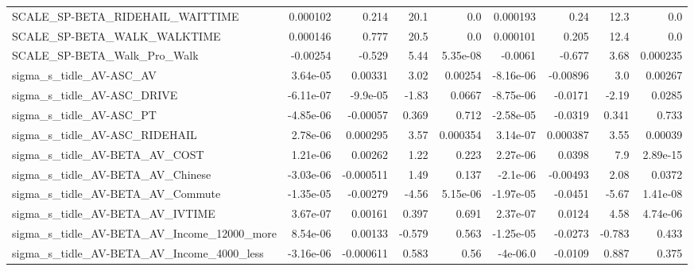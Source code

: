 \begin{tabular}{lrrrrrrrr}
SCALE\_SP-BETA\_RIDEHAIL\_WAITTIME                    &    0.000102 &        0.214 &      20.1 &      0.0 &   0.000193 &        0.24 &         12.3 &           0.0 \\
SCALE\_SP-BETA\_WALK\_WALKTIME                        &    0.000146 &        0.777 &      20.5 &      0.0 &   0.000101 &       0.205 &         12.4 &           0.0 \\
SCALE\_SP-BETA\_Walk\_Pro\_Walk                        &    -0.00254 &       -0.529 &      5.44 & 5.35e-08 &    -0.0061 &      -0.677 &         3.68 &      0.000235 \\
sigma\_s\_tidle\_AV-ASC\_AV                            &    3.64e-05 &      0.00331 &      3.02 &  0.00254 &  -8.16e-06 &    -0.00896 &          3.0 &       0.00267 \\
sigma\_s\_tidle\_AV-ASC\_DRIVE                         &   -6.11e-07 &     -9.9e-05 &     -1.83 &   0.0667 &  -8.75e-06 &     -0.0171 &        -2.19 &        0.0285 \\
sigma\_s\_tidle\_AV-ASC\_PT                            &   -4.85e-06 &     -0.00057 &     0.369 &    0.712 &  -2.58e-05 &     -0.0319 &        0.341 &         0.733 \\
sigma\_s\_tidle\_AV-ASC\_RIDEHAIL                      &    2.78e-06 &     0.000295 &      3.57 & 0.000354 &   3.14e-07 &    0.000387 &         3.55 &       0.00039 \\
sigma\_s\_tidle\_AV-BETA\_AV\_COST                      &    1.21e-06 &      0.00262 &      1.22 &    0.223 &   2.27e-06 &      0.0398 &          7.9 &      2.89e-15 \\
sigma\_s\_tidle\_AV-BETA\_AV\_Chinese                   &   -3.03e-06 &    -0.000511 &      1.49 &    0.137 &   -2.1e-06 &    -0.00493 &         2.08 &        0.0372 \\
sigma\_s\_tidle\_AV-BETA\_AV\_Commute                   &   -1.35e-05 &     -0.00279 &     -4.56 & 5.15e-06 &  -1.97e-05 &     -0.0451 &        -5.67 &      1.41e-08 \\
sigma\_s\_tidle\_AV-BETA\_AV\_IVTIME                    &    3.67e-07 &      0.00161 &     0.397 &    0.691 &   2.37e-07 &      0.0124 &         4.58 &      4.74e-06 \\
sigma\_s\_tidle\_AV-BETA\_AV\_Income\_12000\_more         &    8.54e-06 &      0.00133 &    -0.579 &    0.563 &  -1.25e-05 &     -0.0273 &       -0.783 &         0.433 \\
sigma\_s\_tidle\_AV-BETA\_AV\_Income\_4000\_less          &   -3.16e-06 &    -0.000611 &     0.583 &     0.56 &   -4e-06.0 &     -0.0109 &        0.887 &         0.375 \\

\end{tabular}
